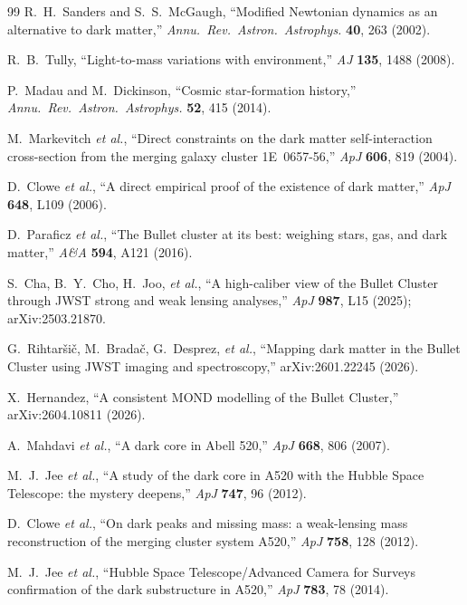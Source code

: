 \documentclass[aps,prd,twocolumn,nofootinbib,floatfix,superscriptaddress]{revtex4-2}
\begin{document}
\begin{thebibliography}{99}
 R.~H.~Sanders and S.~S.~McGaugh,
``Modified Newtonian dynamics as an alternative to dark matter,''
\textit{Annu.~Rev.~Astron.~Astrophys.} \textbf{40}, 263 (2002).

 R.~B.~Tully, ``Light-to-mass variations with
environment,'' \textit{AJ} \textbf{135}, 1488 (2008).

 P.~Madau and M.~Dickinson, ``Cosmic
star-formation history,''
\textit{Annu.~Rev.~Astron.~Astrophys.} \textbf{52}, 415 (2014).


 M.~Markevitch \emph{et al.}, ``Direct
constraints on the dark matter self-interaction cross-section from
the merging galaxy cluster 1E~0657-56,''
\textit{ApJ} \textbf{606}, 819 (2004).

 D.~Clowe \emph{et al.}, ``A direct empirical proof
of the existence of dark matter,'' \textit{ApJ} \textbf{648}, L109
(2006).

 D.~Paraficz \emph{et al.}, ``The Bullet
cluster at its best: weighing stars, gas, and dark matter,''
\textit{A\&A} \textbf{594}, A121 (2016).

 S.~Cha, B.~Y.~Cho, H.~Joo, \emph{et al.},
``A high-caliber view of the Bullet Cluster through JWST strong and
weak lensing analyses,''
\textit{ApJ} \textbf{987}, L15 (2025); arXiv:2503.21870.

 G.~Rihtar\v{s}i\v{c}, M.~Brada\v{c},
G.~Desprez, \emph{et al.}, ``Mapping dark matter in the Bullet
Cluster using JWST imaging and spectroscopy,''
arXiv:2601.22245 (2026).

 X.~Hernandez, ``A consistent MOND modelling
of the Bullet Cluster,'' arXiv:2604.10811 (2026).

 A.~Mahdavi \emph{et al.}, ``A dark core in
Abell 520,'' \textit{ApJ} \textbf{668}, 806 (2007).

 M.~J.~Jee \emph{et al.}, ``A study of the dark core
in A520 with the Hubble Space Telescope: the mystery deepens,''
\textit{ApJ} \textbf{747}, 96 (2012).

 D.~Clowe \emph{et al.}, ``On dark peaks and
missing mass: a weak-lensing mass reconstruction of the merging
cluster system A520,'' \textit{ApJ} \textbf{758}, 128 (2012).

 M.~J.~Jee \emph{et al.}, ``Hubble Space
Telescope/Advanced Camera for Surveys confirmation of the dark
substructure in A520,'' \textit{ApJ} \textbf{783}, 78 (2014).


\end{thebibliography}
\end{document}
